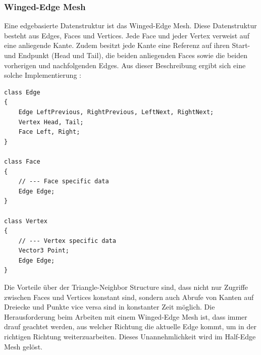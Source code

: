 \subsubsection{Winged-Edge Mesh}
Eine edgebasierte Datenstruktur ist das Winged-Edge Mesh. Diese Datenstruktur besteht aus Edges, Faces und Vertices. Jede Face und jeder Vertex verweist auf eine anliegende Kante. Zudem besitzt jede Kante eine Referenz auf ihren Start- und Endpunkt (Head und Tail), die beiden anliegenden Faces sowie die beiden vorherigen und nachfolgenden Edges. Aus dieser Beschreibung ergibt sich eine solche Implementierung \cite[S.273]{Shirley2010}:

\begin{lstlisting}
class Edge
{
	Edge LeftPrevious, RightPrevious, LeftNext, RightNext;
	Vertex Head, Tail;
	Face Left, Right;
}

class Face 
{
	// --- Face specific data
	Edge Edge;
}

class Vertex 
{
	// --- Vertex specific data
	Vector3 Point;
	Edge Edge;
}
\end{lstlisting}

Die Vorteile \"uber der Triangle-Neighbor Structure sind, dass nicht nur Zugriffe zwischen Faces und Vertices konstant sind, sondern auch Abrufe von Kanten auf Dreiecke und Punkte vice versa sind in konstanter Zeit m\"oglich. Die Herausforderung beim Arbeiten mit einem Winged-Edge Mesh ist, dass immer drauf geachtet werden, aus welcher Richtung die aktuelle Edge kommt, um in der richtigen Richtung weiterzuarbeiten. Dieses Unannehmlichkeit wird im Half-Edge Mesh gel\"ost.